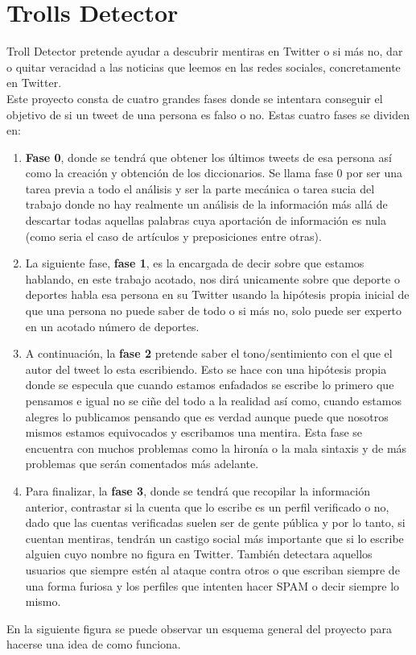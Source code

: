 \documentclass[../all.tex]{subfiles}
\begin{document}
    \section{Trolls Detector}
	
	Troll Detector pretende ayudar a descubrir mentiras en Twitter o si más no, dar o quitar veracidad a las noticias que leemos en las redes sociales, concretamente en Twitter.\\
	
	Este proyecto consta de cuatro grandes fases donde se intentara conseguir el objetivo de si un tweet de una persona es falso o no. Estas cuatro fases se dividen en:
	
	\begin{enumerate}
		\item \textbf{Fase 0}, donde se tendrá que obtener  los últimos tweets de esa persona así como la creación y obtención de los diccionarios. Se llama fase 0 por ser una tarea previa  a todo el análisis y ser la parte mecánica o tarea sucia del trabajo donde no hay realmente un análisis de la información más allá de descartar todas aquellas palabras cuya aportación de información es nula (como seria el caso de artículos y preposiciones entre otras).
		
		\item La siguiente fase, \textbf{fase 1}, es la encargada de decir sobre que estamos hablando, en este trabajo acotado, nos dirá unicamente sobre que deporte o deportes habla esa persona en su Twitter usando la hipótesis propia inicial de que una persona no puede saber de todo o si más no, solo puede ser experto en un acotado número de deportes.
		
		\item A continuación, la \textbf{fase 2} pretende saber el tono/sentimiento con el que el autor del tweet lo esta escribiendo. Esto se hace con una hipótesis propia donde se especula que cuando estamos enfadados se escribe lo primero que pensamos e igual no se ciñe del todo a la realidad así como, cuando estamos alegres lo publicamos pensando que es verdad aunque puede que nosotros mismos estamos equivocados y escribamos una mentira. Esta fase se encuentra con muchos problemas como la hironía o la mala sintaxis y de más problemas que serán comentados más adelante.
		
		\item Para finalizar, la \textbf{fase 3}, donde se tendrá que recopilar la información anterior, contrastar si la cuenta que lo escribe es un perfil verificado o no, dado que las cuentas verificadas suelen ser de gente pública y por lo tanto, si cuentan mentiras, tendrán un castigo social más importante que si lo escribe alguien cuyo nombre no figura en Twitter. También detectara aquellos usuarios que siempre estén al ataque contra otros o que escriban siempre de una forma furiosa y los perfiles que intenten hacer SPAM o decir siempre lo mismo.
		
	\end{enumerate}
	\newpage
	En la siguiente figura se puede observar un esquema general del proyecto para hacerse una idea de como funciona.
	
\end{document}
